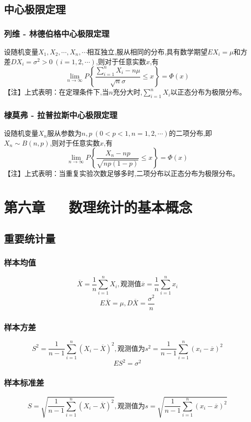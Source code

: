 \documentclass[UTF8]{ctexart}
\theoremstyle{remark}
\begin{document}
		\subsection{中心极限定理}
		\subsubsection{列维 - 林德伯格中心极限定理}
		设随机变量\(X_1, X_2, \cdots, X_n, \cdots\)相互独立,服从相同的分布,具有数学期望\(EX_i = \mu\)和方差\(DX_i=\sigma^{2}>0\ (i = 1,2,\cdots)\),则对于任意实数\(x\),有
		\[
		\lim_{n \to \infty} P\left\{\frac{\sum_{i = 1}^{n}X_i - n\mu}{\sqrt{n}\sigma}\leq x\right\} = \varPhi(x)
		\]
		【注】上式表明：在定理条件下,当\(n\)充分大时,\(\sum_{i = 1}^{n}X_i\)以正态分布为极限分布。
		
		\subsubsection{棣莫弗 - 拉普拉斯中心极限定理}
		设随机变量\(X_n\)服从参数为\(n,p\ (0 < p < 1, n = 1,2,\cdots)\)的二项分布,即\(X_n\sim B(n,p)\),则对于任意实数\(x\),有
		\[
		\lim_{n \to \infty} P\left\{\frac{X_n - np}{\sqrt{np(1 - p)}}\leq x\right\} = \varPhi(x)
		\]
		【注】上式表明：当重复实验次数足够多时,二项分布以正态分布为极限分布。
		\section{第六章~~~数理统计的基本概念}
		\subsection{重要统计量}
		\subsubsection{样本均值}
		\[
		\overline{X}=\frac{1}{n}\sum_{i = 1}^{n}X_i,观测值\overline{x}=\frac{1}{n}\sum_{i = 1}^{n}x_i
		\]
		\[
		E\overline{X}=\mu,D\overline{X}=\frac{\sigma^{2}}{n}
		\]
		
		\subsubsection{样本方差}
		\[
		S^{2}=\frac{1}{n - 1}\sum_{i = 1}^{n}(X_i - \overline{X})^{2},观测值为s^{2}=\frac{1}{n - 1}\sum_{i = 1}^{n}(x_i - \overline{x})^{2}
		\]
		\[
		ES^{2}=\sigma^{2}
		\]
		
		\subsubsection{样本标准差}
		\[
		S=\sqrt{\frac{1}{n - 1}\sum_{i = 1}^{n}(X_i - \overline{X})^{2}},观测值为s=\sqrt{\frac{1}{n - 1}\sum_{i = 1}^{n}(x_i - \overline{x})^{2}}
		\]
		
\end{document}
